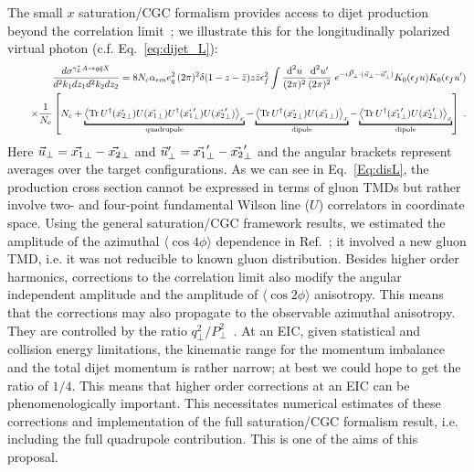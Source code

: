 { 
	The small $x$ saturation/CGC formalism provides access to dijet production beyond the
	correlation limit~\cite{Dominguez:2011wm}; we illustrate this for the longitudinally 
	polarized virtual photon (c.f. Eq.~\eqref{eq:dijet_L}): 
	\begin{eqnarray}
&&\frac{d\sigma ^{\gamma_{L}^{\ast }A\rightarrow q\bar{q}X}}{d^2k_1dz_1d^2k_2dz_2}
= 8N_{c}\alpha _{em}e_{q}^{2} \, (2\pi)^2 \delta(1 -z- \bar{z}) 
z \bar{z} \epsilon_f^2
\int \frac{\text{d}^{2}u}{(2\pi)^{2}}\frac{\text{d}^{2}u^{\prime }}{(2\pi )^{2}}
\; e^{-i \v{P}\cdot(\v{u}-\v{u}^{\prime})}
 K_0(\epsilon_f u )   K_0(\epsilon_f u^\prime)  \\
&&~~~~\times 
\frac{1}{N_c}\left[
N_c+
\underbracket{
\left< {\rm Tr}\,
U^\dagger(\v{x_2})  U(\v{x_1}) U^\dagger(\v{x_1}^{\prime})  U(\v{x_2}^{\prime})
\right>_x}_{\rm quadrupole} 
-
\underbracket{\left< {\rm Tr}\,
U^\dagger(\v{x_2})  U(\v{x_1}) \right>_x}_{\rm dipole}
-
\underbracket{
\left< {\rm Tr}\,
U^\dagger(\v{x_1}^\prime)  U(\v{x_2}^\prime) \right>_x }_{\rm dipole}
\right] ~.  \label{Eq:disL} \notag
\end{eqnarray}
Here $ \vec {u}_\perp = \vec {x_1}_\perp - \vec {x_2}_\perp $ and $ \vec {u}_\perp ^\prime= \vec {x_1}_\perp ^\prime- \vec {x_2}_\perp ^\prime$ and the angular brackets  represent averages over the 
target configurations. 
As we can see in Eq.~\eqref{Eq:disL},  the production cross section cannot be expressed in terms of  
	gluon TMDs but rather involve two- and four-point fundamental Wilson line ($U$) correlators  in coordinate space. 
	Using the general saturation/CGC framework results,  we 
	estimated the amplitude of the azimuthal $\langle \cos 4\phi  \rangle$
	dependence in Ref.~\cite{Dumitru:2016jku}; it involved a new gluon TMD, i.e. it was not reducible to known gluon distribution. 
	Besides higher order harmonics, corrections to the correlation limit also 
	modify the angular independent amplitude and the amplitude of $\langle \cos 2\phi  \rangle$ anisotropy.
	This means that the corrections may also propagate to the observable azimuthal anisotropy.  
	They are controlled by the ratio $q_\perp^2/P_\perp^2$~\cite{Dumitru:2016jku}.    
	At an EIC, given statistical and collision energy limitations,  the kinematic range for the momentum imbalance and the 
	total dijet momentum is rather narrow; at best we could hope to get the ratio of $1/4$.
	This means that higher order corrections at an EIC can be phenomenologically important. 
	This necessitates numerical estimates of these corrections and implementation of the 
	full saturation/CGC formalism result, i.e. including the   full quadrupole contribution.   
	This is one of the aims of this proposal. 
	}




